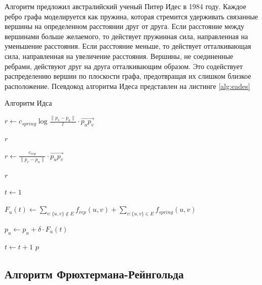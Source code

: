 \documentclass[14pt, russian]{scrartcl}
\begin{document}
Алгоритм предложил австралийский ученый Питер Идес в 1984 году. Каждое ребро графа моделируется как пружина, которая стремится удерживать связанные вершины на определенном расстоянии друг от друга. Если расстояние между вершинами больше желаемого, то действует пружинная сила, направленная на уменьшение расстояния. Если расстояние меньше, то действует отталкивающая сила, направленная на увеличение расстояния. Вершины, не соединенные ребрами, действуют друг на друга отталкивающим образом. Это содействует распределению вершин по плоскости графа, предотвращая их слишком близкое расположение. Псевдокод алгоритма Идеса представлен на листинге \ref{alg:eades}
\begin{algorithm}
\caption{Алгоритм Идса}\label{alg:eades}
\begin{algorithmic}

  \State $r \gets c_{spring}\log{\frac{\|p_v - p_u \|}{l}}  \cdot \overrightarrow{p_u p_v}  $
  
  \Return $r$  
  \EndFunction

 
  \State $r \gets \frac{c_{rep}}{\|p_v - p_u \|} \cdot \overrightarrow{p_u p_v}  $
  
  \Return $r$  
  \EndFunction
 

	\State $t \gets 1$

			\State $F_{u}(t) \gets \sum_{v:\{u,v\} \notin E}{f_{rep}(u, v)} + \sum_{v:\{u,v\} \in E}{f_{spring}(u, v)}$
		

		\EndFor
			\State $p_u \gets p_u + \delta \cdot F_u(t)$
		\EndFor
		
		\State $t \gets t + 1$
	\EndWhile
	\Return $p$
	\EndFunction


\end{algorithmic}
\end{algorithm}


\subsection{Алгоритм Фрюхтермана-Рейнгольда }
\end{document}
